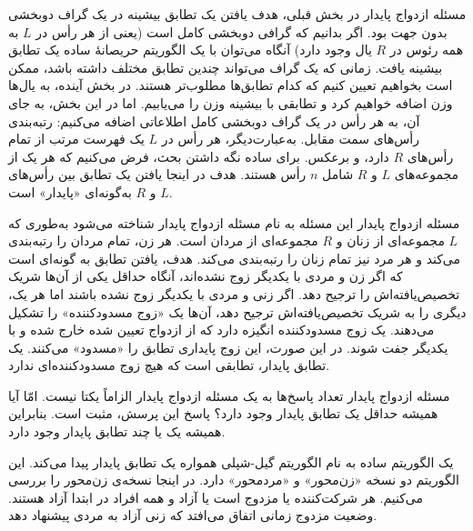 \begin{itemframe}{مسئله ازدواج پایدار}
\itm
در بخش قبلی، هدف یافتن یک تطابق بیشینه در یک گراف دوبخشی بدون جهت بود.
اگر بدانیم که گرافی دوبخشی کامل است (یعنی از هر رأس در $L$ به همه رئوس در $R$ یال وجود دارد) آنگاه می‌توان با یک الگوریتم حریصانهٔ ساده یک تطابق بیشینه یافت.
\itm
زمانی که یک گراف می‌تواند چندین تطابق مختلف داشته باشد، ممکن است بخواهیم تعیین کنیم که کدام تطابق‌ها مطلوب‌تر هستند. در بخش آینده، به یال‌ها وزن اضافه خواهیم کرد و تطابقی با بیشینه وزن را می‌یابیم.
\itm
اما در این بخش، به جای آن، به هر رأس در یک گراف دوبخشی کامل اطلاعاتی اضافه می‌کنیم: رتبه‌بندی رأس‌های سمت مقابل. به‌عبارت‌دیگر، هر رأس در $L$ یک فهرست مرتب از تمام رأس‌های $R$ دارد، و برعکس. برای ساده نگه داشتن بحث، فرض می‌کنیم که هر یک از مجموعه‌های $L$ و $R$ شامل $n$ رأس هستند. هدف در اینجا یافتن یک تطابق بین رأس‌های $L$ و $R$ به‌گونه‌ای «پایدار» است.
\end{itemframe}


\begin{itemframe}{مسئله ازدواج پایدار}
\itm
این مسئله به نام مسئله ازدواج پایدار
شناخته می‌شود به‌طوری که $L$ مجموعه‌ای از زنان و $R$ مجموعه‌ای از مردان است. هر زن، تمام مردان را  رتبه‌بندی می‌کند و هر مرد نیز تمام زنان را رتبه‌بندی می‌کند.
\itm
هدف، یافتن تطابق به گونه‌ای است که اگر زن و مردی با یکدیگر زوج نشده‌اند، آنگاه حداقل یکی از آن‌ها شریک تخصیص‌یافته‌اش را ترجیح دهد.
\itm
اگر زنی و مردی با یکدیگر زوج نشده باشند اما هر یک، دیگری را به شریک تخصیص‌یافته‌اش ترجیح دهد، آن‌ها یک «زوج مسدودکننده»
را تشکیل می‌دهند. یک زوج مسدودکننده انگیزه دارد که از ازدواج تعیین شده خارج شده و با یکدیگر جفت شوند. در این صورت، این زوج پایداری تطابق را «مسدود» می‌کنند.
\itm
یک تطابق پایدار، تطابقی است که هیچ زوج مسدودکننده‌ای ندارد.
\end{itemframe}


\begin{itemframe}{مسئله ازدواج پایدار}
\itm
تعداد پاسخ‌ها به یک مسئله ازدواج پایدار الزاماً یکتا نیست. امّا آیا همیشه حداقل یک تطابق پایدار وجود دارد؟ پاسخ این پرسش، مثبت است. بنابراین همیشه یک یا چند تطابق پایدار وجود دارد.

\itm
یک الگوریتم ساده به نام الگوریتم گیل-شپلی
همواره یک تطابق پایدار پیدا می‌کند. این الگوریتم دو نسخه «زن‌محور»
و «مرد‌محور»
دارد. در اینجا نسخه‌ی زن‌محور را بررسی می‌کنیم.
\itm
هر شرکت‌کننده یا مزدوج است یا آزاد و همه افراد در ابتدا آزاد هستند.
وضعیت مزدوج زمانی اتفاق می‌افتد که زنی آزاد به مردی پیشنهاد دهد.
\end{itemframe}


